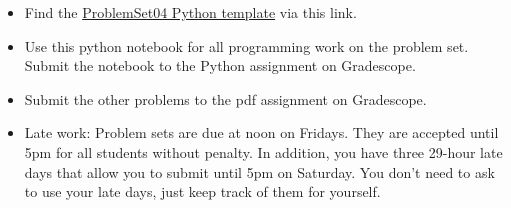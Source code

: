 \documentclass[12pt,letterpaper,noanswers]{exam}
\begin{document}
 \pdfpageheight 11in 
  \pdfpagewidth 8.5in

\begin{itemize}
    \itemsep0pt
    \item Find the \href{https://github.com/sarah1123/ScientificComputing-APMTH111/blob/main/2023Fall/PythonFiles/04_solvingnonlinear/ProblemSet04.ipynb}{ProblemSet04 Python template} via this link.
    \item Use this python notebook for all programming work on the problem set.  Submit the notebook to the Python assignment on Gradescope.
    \item Submit the other problems to the pdf assignment on Gradescope.
    \item Late work: Problem sets are due at noon on Fridays.  They are accepted until 5pm for all students without penalty.  In addition, you have three 29-hour late days that allow you to submit until 5pm on Saturday.  You don't need to ask to use your late days, just keep track of them for yourself.
\end{itemize}

 
\end{document}
